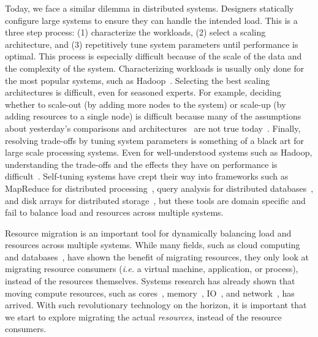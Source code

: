 Today, we face a similar dilemma in distributed systems. Designers statically configure large systems to ensure they can handle the intended load. This is a three step process: (1) characterize the workloads, (2) select a scaling architecture, and (3) repetitively tune system parameters until performance is optimal. This process is especially difficult because of the scale of the data and the complexity of the system. Characterizing workloads is usually only done for the most popular systems, such as Hadoop~\cite{chen:2012ccpe-distributed-db,chen:2012vldb-cross-industry,chen:2011mascots-suites,huang:icde2010-hibench}. Selecting the best scaling architectures is difficult, even for seasoned experts. For example, deciding whether to scale-out (by adding more nodes to the system) or scale-up (by adding resources to a single node) is difficult because many of the assumptions about yesterday's comparisons and architectures~\cite{michael:2007pdps-scale-up-x-scale-out,talkington:2002journal-scaling,wisniewski:2007europar-commercial-scale-out} are not true today~\cite{appuswamy:socc2013-hadoop-vs-single-node,rowstron:hotcdp2012-hadoop-vs-single-node,sevilla:discs2013-framework,sevilla:lspp2014-supmr}. Finally, resolving trade-offs by tuning system parameters is something of a black art for large scale processing systems. Even for well-understood systems such as Hadoop, understanding the trade-offs and the effects they have on performance is difficult~\cite{herodotou:cidr2011-starfish,wang:mascots2009-mrperf}.  Self-tuning systems have crept their way into frameworks such as MapReduce for distributed processing~\cite{herodotou:cidr2011-starfish}, query analysis for distributed databases~\cite{lefevre:danac2013-evolutionary-analytics}, and disk arrays for distributed storage~\cite{anderson:fast2001-hippodrome}, but these tools are domain specific and fail to balance load and resources across multiple systems. 


Resource migration is an important tool for dynamically balancing load and resources across multiple systems. While many fields, such as cloud computing~\cite{zhang:journal2010-cloud-challenges} and databases~\cite{elmore:sigmod2013-pythia}, have shown the benefit of migrating resources, they only look at migrating resource consumers ({\it i.e.} a virtual machine, application, or process), instead of the resources themselves. Systems research has already shown that moving compute resources, such as cores~\cite{zhang:journal2010-cloud-challenges}, memory~\cite{chapman:atc2009-vnuma}, IO~\cite{raj:hpdc2007-io-virtualization}, and network~\cite{georgiadis:atn1996-network-qos}, has arrived. With such revolutionary technology on the horizon, it is important that we start to explore migrating the actual {\it resources}, instead of the resource consumers.

